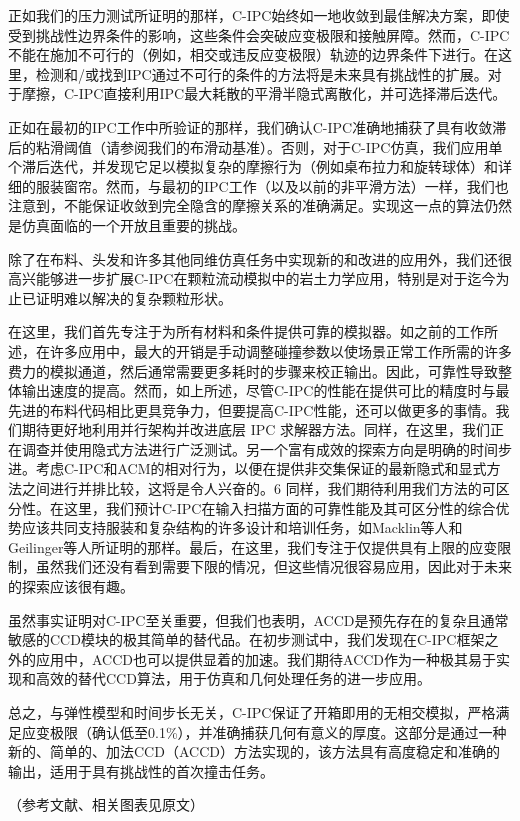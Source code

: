 \documentclass[lang=cn]{ctexart}
\begin{document}
正如我们的压力测试所证明的那样，C-IPC始终如一地收敛到最佳解决方案，即使受到挑战性边界条件的影响，这些条件会突破应变极限和接触屏障。然而，C-IPC不能在施加不可行的（例如，相交或违反应变极限）轨迹的边界条件下进行。在这里，检测和/或找到IPC通过不可行的条件的方法将是未来具有挑战性的扩展。对于摩擦，C-IPC直接利用IPC最大耗散的平滑半隐式离散化，并可选择滞后迭代。

正如在最初的IPC工作中所验证的那样，我们确认C-IPC准确地捕获了具有收敛滞后的粘滑阈值（请参阅我们的布滑动基准）。否则，对于C-IPC仿真，我们应用单个滞后迭代，并发现它足以模拟复杂的摩擦行为（例如桌布拉力和旋转球体）和详细的服装窗帘。然而，与最初的IPC工作（以及以前的非平滑方法）一样，我们也注意到，不能保证收敛到完全隐含的摩擦关系的准确满足。实现这一点的算法仍然是仿真面临的一个开放且重要的挑战。

除了在布料、头发和许多其他同维仿真任务中实现新的和改进的应用外，我们还很高兴能够进一步扩展C-IPC在颗粒流动模拟中的岩土力学应用，特别是对于迄今为止已证明难以解决的复杂颗粒形状。

在这里，我们首先专注于为所有材料和条件提供可靠的模拟器。如之前的工作所述，在许多应用中，最大的开销是手动调整碰撞参数以使场景正常工作所需的许多费力的模拟通道，然后通常需要更多耗时的步骤来校正输出。因此，可靠性导致整体输出速度的提高。然而，如上所述，尽管C-IPC的性能在提供可比的精度时与最先进的布料代码相比更具竞争力，但要提高C-IPC性能，还可以做更多的事情。我们期待更好地利用并行架构并改进底层 IPC 求解器方法。同样，在这里，我们正在调查并使用隐式方法进行广泛测试。另一个富有成效的探索方向是明确的时间步进。考虑C-IPC和ACM的相对行为，以便在提供非交集保证的最新隐式和显式方法之间进行并排比较，这将是令人兴奋的。6 同样，我们期待利用我们方法的可区分性。在这里，我们预计C-IPC在输入扫描方面的可靠性能及其可区分性的综合优势应该共同支持服装和复杂结构的许多设计和培训任务，如Macklin等人和Geilinger等人所证明的那样。最后，在这里，我们专注于仅提供具有上限的应变限制，虽然我们还没有看到需要下限的情况，但这些情况很容易应用，因此对于未来的探索应该很有趣。

虽然事实证明对C-IPC至关重要，但我们也表明，ACCD是预先存在的复杂且通常敏感的CCD模块的极其简单的替代品。在初步测试中，我们发现在C-IPC框架之外的应用中，ACCD也可以提供显着的加速。我们期待ACCD作为一种极其易于实现和高效的替代CCD算法，用于仿真和几何处理任务的进一步应用。

总之，与弹性模型和时间步长无关，C-IPC保证了开箱即用的无相交模拟，严格满足应变极限（确认低至0.1\%），并准确捕获几何有意义的厚度。这部分是通过一种新的、简单的、加法CCD（ACCD）方法实现的，该方法具有高度稳定和准确的输出，适用于具有挑战性的首次撞击任务。

（参考文献、相关图表见原文）
\end{document}
